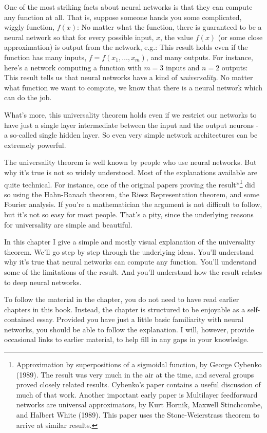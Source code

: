
One of the most striking facts about neural networks is that they can compute any function at all. That is, suppose someone hands you some complicated, wiggly function, $f(x)$: No matter what the function, there is guaranteed to be a neural network so that for every possible input, $x$, the value $f(x)$ (or some close approximation) is output from the network, e.g.: This result holds even if the function has many inputs, $f = f(x_1, \ldots, x_m)$, and many outputs. For instance, here's a network computing a function with $m = 3$ inputs and $n = 2$ outputs: This result tells us that neural networks have a kind of \emph{universality}. No matter what function we want to compute, we know that there is a neural network which can do the job.


What's more, this universality theorem holds even if we restrict our networks to have just a single layer intermediate between the input and the output neurons - a so-called single hidden layer. So even very simple network architectures can be extremely powerful.


The universality theorem is well known by people who use neural networks. But why it's true is not so widely understood. Most of the explanations available are quite technical. For instance, one of the original papers proving the result*\footnote{Approximation by superpositions of a sigmoidal function, by George Cybenko (1989). The result was very much in the air at the time, and several groups proved closely related results. Cybenko's paper contains a useful discussion of much of that work. Another important early paper is Multilayer feedforward networks are universal approximators, by Kurt Hornik, Maxwell Stinchcombe, and Halbert White (1989). This paper uses the Stone-Weierstrass theorem to arrive at similar results.} did so using the Hahn-Banach theorem, the Riesz Representation theorem, and some Fourier analysis. If you're a mathematician the argument is not difficult to follow, but it's not so easy for most people. That's a pity, since the underlying reasons for universality are simple and beautiful.


In this chapter I give a simple and mostly visual explanation of the universality theorem. We'll go step by step through the underlying ideas. You'll understand why it's true that neural networks can compute any function. You'll understand some of the limitations of the result. And you'll understand how the result relates to deep neural networks.


To follow the material in the chapter, you do not need to have read earlier chapters in this book. Instead, the chapter is structured to be enjoyable as a self-contained essay. Provided you have just a little basic familiarity with neural networks, you should be able to follow the explanation. I will, however, provide occasional links to earlier material, to help fill in any gaps in your knowledge.


